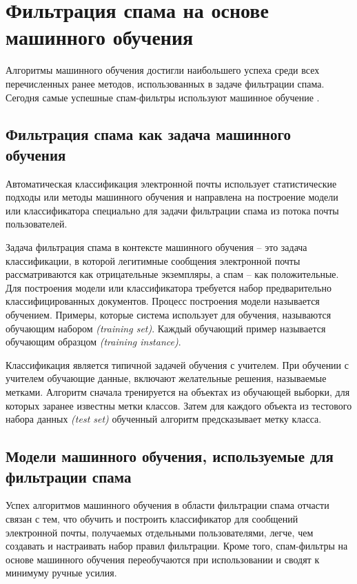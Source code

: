 \section{Фильтрация спама на основе машинного обучения}\label{Section:ML}
Алгоритмы машинного обучения достигли наибольшего успеха среди всех 
перечисленных ранее методов, использованных в задаче фильтрации спама.
Сегодня самые успешные спам-фильтры используют машинное обучение \cite{filters}.

\subsection{Фильтрация спама как задача машинного обучения}
Автоматическая классификация электронной почты использует статистические подходы 
или методы машинного обучения и направлена ​​на построение модели или классификатора 
специально для задачи фильтрации спама из потока почты пользователей.

Задача фильтрация спама в контексте машинного обучения -- это задача классификации, 
в которой легитимные сообщения электронной почты рассматриваются как отрицательные 
экземпляры, а спам -- как положительные. Для построения модели или классификатора 
требуется набор предварительно классифицированных документов. Процесс построения 
модели называется обучением. Примеры, которые система использует для обучения, 
называются обучающим набором \emph{(training set)}. Каждый обучающий при­мер называется 
обучающим образцом \emph{(training instance)}.

Классификация является типичной задачей обучения с учителем. При обучении с учителем 
обучающие данные, включают желательные решения, называемые метками. Алгоритм сначала 
тренируется на объектах из обучающей выборки, для которых заранее известны метки классов. 
Затем для каждого объекта из тестового набора данных \emph{(test set)} обученный алгоритм 
предсказывает метку класса.

\subsection{Модели машинного обучения, используемые для фильтрации спама}\label{ML}

Успех алгоритмов машинного обучения в области фильтрации спама отчасти связан с тем, что 
обучить и построить классификатор для сообщений электронной почты, получаемых отдельными 
пользователями, легче,  чем создавать и настраивать набор правил фильтрации. Кроме того, 
спам-фильтры на основе машинного обучения переобучаются при использовании и сводят к 
минимуму ручные усилия.

